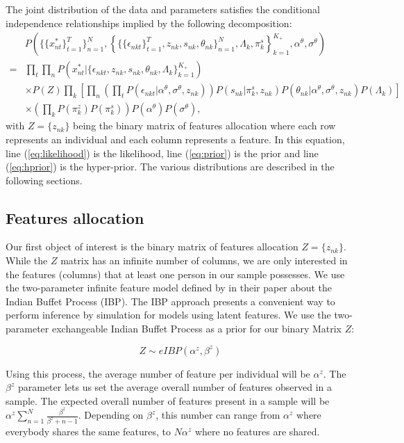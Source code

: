 \documentclass[12pt]{article}
\begin{document}
The joint distribution of the data and parameters satisfies the conditional independence relationships implied by the following decomposition:
\begin{align}
		& P\left( \{\{x_{nt}^*\}_{t=1}^T\}_{n=1}^N, \left\{ \{\{\epsilon_{nkt}\}_{t=1}^T, z_{nk},s_{nk}, \theta_{nk} \}_{n=1}^N, \Lambda_{k}, \pi_k^s \right\}_{k=1}^{K_+},\alpha^\theta, \sigma^\theta \right) \\
	=	& \label{eq:likelihood} \prod_t \prod_{n} P\left(x_{nt}^*|\{\epsilon_{nkt},z_{nk},s_{nk}, \theta_{nk},\Lambda_{k}  \}_{k=1}^{K_+}\right) \\
		& \label{eq:prior} \times P(Z) \prod_k 
		\left[
			\prod_n 
				\left( \prod_t P(\epsilon_{nkt}|\alpha^\theta,\sigma^\theta,z_{nk}) \right) 
				P(s_{nk}|\pi_k^s,z_{nk})
				P(\theta_{nk}|\alpha^\theta, \sigma^\theta, z_{nk})
				P(\Lambda_{k})
		\right] \\
		&  \label{eq:hprior}\times
		\left(\prod_k
			P(\pi_k^z)
			P(\pi_k^s)\right) 
		P(\alpha^\theta)
		P(\sigma^\theta),
\end{align}
with $Z=\{z_{nk}\}$ being the binary matrix of features allocation where each row represents an individual and each column represents a feature. In this equation, line (\ref{eq:likelihood}) is the likelihood, line (\ref{eq:prior}) is the prior and line (\ref{eq:hprior}) is the hyper-prior. The various distributions are described in the following sections.

\subsection{Features allocation}

Our first object of interest is the binary matrix of features allocation $Z=\{z_{nk}\}$. While the $Z$ matrix has an infinite number of columns, we are only interested in the features (columns) that at least one person in our sample possesses. We use the two-parameter infinite feature model defined by \cite{griffiths2011indian} in their paper about the Indian Buffet Process (IBP). The IBP approach presents a convenient way to perform inference by simulation for models using latent features. We use the two-parameter exchangeable Indian Buffet Process as a prior for our binary Matrix $Z$:

$$ Z \sim eIBP(\alpha^z,\beta^z) $$ 

Using this process, the average number of feature per individual will be $\alpha^z$. The $\beta^z$ parameter lets us set the average overall number of features observed in a sample. The expected overall number of features present in a sample will be $\alpha^z \sum_{n=1}^{N} \frac{\beta^z}{\beta^z + n - 1}$. Depending on $\beta^z$, this number can range from $\alpha^z$ where everybody shares the same features, to $N\alpha^z$ where no features are shared.
\end{document}
